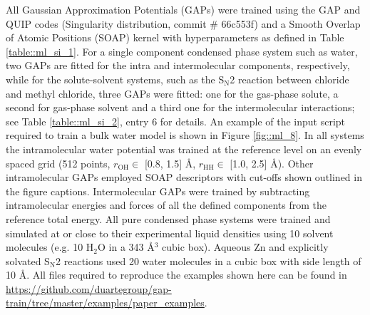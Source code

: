 \documentclass[../../main.tex]{subfiles}
\begin{document}
All Gaussian Approximation Potentials (GAPs) were trained using the GAP and QUIP codes (Singularity distribution, commit \# 66c553f) and a Smooth Overlap of Atomic Positions (SOAP)\cite{Bartok2013} kernel with hyperparameters as defined in Table \ref{table::ml_si_1}. For a single component condensed phase system such as water, two GAPs are fitted for the intra and intermolecular components, respectively, while for the solute-solvent systems, such as the S${}_\text{N}$2 reaction between chloride and methyl chloride, three GAPs were fitted: one for the gas-phase solute, a second for gas-phase solvent and a third one for the intermolecular interactions; see Table \ref{table::ml_si_2}, entry 6 for details. An example of the input script required to train a bulk water model is shown in Figure \ref{fig::ml_8}. In all systems the intramolecular water potential was trained at the reference level on an evenly spaced grid (512 points, $r_\text{OH} \in$ [0.8, 1.5] \AA, $r_\text{HH}\in$ [1.0, 2.5] \AA). Other intramolecular GAPs employed SOAP descriptors with cut-offs shown outlined in the figure captions. Intermolecular GAPs were trained by subtracting intramolecular energies and forces of all the defined components from the reference total energy. All pure condensed phase systems were trained and simulated at or close to their experimental liquid densities using 10 solvent molecules (e.g. 10 H${}_2$O in a 343 \AA${}^3$ cubic box). Aqueous Zn and explicitly solvated S${}_\text{N}$2 reactions used 20 water molecules in a cubic box with side length of 10 \AA. All files required to reproduce the examples shown here can be found in {\url{https://github.com/duartegroup/gap-train/tree/master/examples/paper_examples}}.
\end{document}
